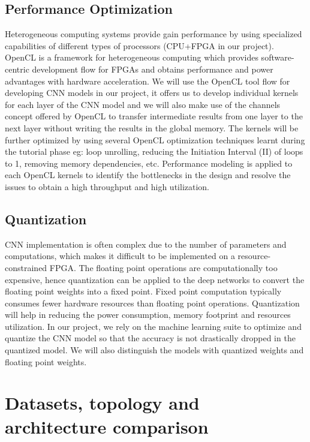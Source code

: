 \documentclass[titlepage]{report}
\begin{document}
\section{Performance Optimization}
Heterogeneous computing systems provide gain performance by using specialized capabilities of different types of processors (CPU+FPGA in our project). OpenCL is a framework for heterogeneous computing which provides software-centric development flow for FPGAs and obtains performance and power advantages with hardware acceleration. We will use the OpenCL tool flow for developing CNN models in our project, it offers us to develop individual kernels for each layer of the CNN model and we will also make use of the channels concept offered by OpenCL to transfer intermediate results from one layer to the next layer without writing the results in the global memory. The kernels will be further optimized by using several OpenCL optimization techniques learnt during the tutorial phase eg: loop unrolling, reducing the Initiation Interval (II) of loops to 1, removing memory dependencies, etc. Performance modeling is applied to each OpenCL kernels to identify the bottlenecks in the design and resolve the issues to obtain a high throughput and high utilization.

\section{Quantization }
CNN implementation is often complex due to the number of parameters and computations, which makes it difficult to be implemented on a resource-constrained FPGA. The floating point operations are computationally too expensive, hence quantization can be applied to the deep networks to convert the floating point weights into a fixed point. Fixed point computation typically consumes fewer hardware resources than floating point operations. Quantization will help in reducing the power consumption, memory footprint and resources utilization. In our project, we rely on the machine learning suite to optimize and quantize the CNN model so that the accuracy is not drastically dropped in the quantized model. We will also distinguish the models with quantized weights and floating point weights.


\chapter{Datasets, topology and architecture comparison}
\end{document}
